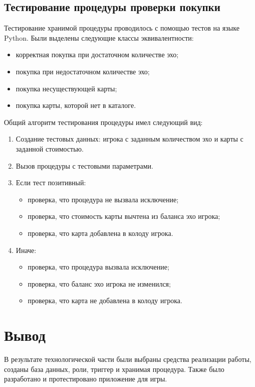\subsection{Тестирование процедуры проверки покупки}

Тестирование хранимой процедуры проводилось с помощью тестов на языке Python.
Были выделены следующие классы эквивалентности:

\begin{itemize}
	\item корректная покупка при достаточном количестве эхо;
	\item покупка при недостаточном количестве эхо;
	\item покупка несуществующей карты;
	\item покупка карты, которой нет в каталоге.
\end{itemize}

Общий алгоритм тестирования процедуры имел следующий вид:

\begin{enumerate}
	\item Создание тестовых данных: игрока с заданным количеством эхо и
	      карты с заданной стоимостью.
	\item Вызов процедуры с тестовыми параметрами.
	\item Если тест позитивный:
	      \begin{itemize}
		      \item проверка, что процедура не вызвала исключение;
		      \item проверка, что стоимость карты вычтена из баланса
		            эхо
		            игрока;
		      \item проверка, что карта добавлена в колоду игрока.
	      \end{itemize}
	\item Иначе:
	      \begin{itemize}
		      \item проверка, что процедура вызвала исключение;
		      \item проверка, что баланс эхо игрока не изменился;
		      \item проверка, что карта не добавлена в колоду игрока.
	      \end{itemize}
\end{enumerate}

\section*{Вывод}
В результате технологической части были выбраны средства реализации работы,
созданы
база данных, роли, триггер и хранимая процедура. Также было разработано и
протестировано приложение для игры.